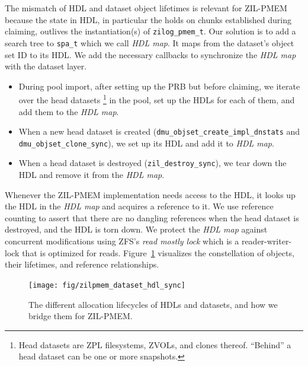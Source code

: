 \documentclass[12pt,a4paper,twoside]{book}
\begin{document}
{The mismatch of HDL and dataset object lifetimes is relevant for ZIL-PMEM because the state in HDL, in particular the holds on chunks established during claiming, outlives the instantiation(s) of \lstinline{zilog_pmem_t}.
Our solution is to add a search tree to \lstinline{spa_t} which we call \textit{HDL map}.
It maps from the dataset's object set ID to its HDL.
We add the necessary callbacks to synchronize the \textit{HDL map} with the dataset layer.
\begin{itemize}[noitemsep]
    \item During pool import, after setting up the PRB but before claiming, we iterate over the head datasets%
        \footnote{Head datasets are ZPL filesystems, ZVOLs, and clones thereof. ``Behind'' a head dataset can be one or more snapshots.}
        in the pool, set up the HDLs for each of them, and add them to the \textit{HDL map}.
    \item When a new head dataset is created (\lstinline{dmu_objset_create_impl_dnstats} and \lstinline{dmu_objset_clone_sync}), we set up its HDL and add it to \textit{HDL map}.
    \item When a head dataset is destroyed (\lstinline{zil_destroy_sync}), we tear down the HDL and remove it from the \textit{HDL map}.
\end{itemize}

Whenever the ZIL-PMEM implementation needs access to the HDL, it looks up the HDL in the \textit{HDL map} and acquires a reference to it.
We use reference counting to assert that there are no dangling references when the head dataset is destroyed, and the HDL is torn down.
We protect the \textit{HDL map} against concurrent modifications using ZFS's \textit{read mostly lock} which is a reader-writer-lock that is optimized for reads.
Figure~\ref{fig:zilpmem:datasethdlsync} visualizes the constellation of objects, their lifetimes, and reference relationships.

\begin{figure}[H]
    \centering
    \texttt{[image: fig/zilpmem\_dataset\_hdl\_sync]}
    \caption{The different allocation lifecycles of HDLs and datasets, and how we bridge them for ZIL-PMEM.}
    \label{fig:zilpmem:datasethdlsync}
\end{figure}

}
\end{document}
